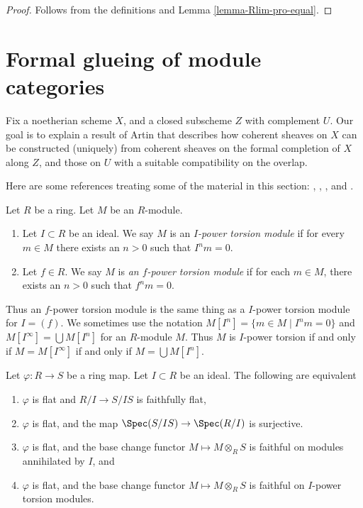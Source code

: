 \begin{proof}
Follows from the definitions and Lemma \ref{lemma-Rlim-pro-equal}.
\end{proof}










\section{Formal glueing of module categories}
\label{section-formal-glueing}

\noindent
Fix a noetherian scheme $X$, and a closed subscheme $Z$ with complement $U$.
Our goal is to explain a result of Artin that describes how coherent sheaves on
$X$ can be constructed (uniquely) from coherent sheaves on the formal
completion of $X$ along $Z$, and those on $U$ with a suitable compatibility on
the overlap.

\medskip\noindent
Here are some references treating some of the material in this section:
\cite[Section 2]{ArtinII},
\cite[Appendix]{Ferrand-Raynaud},
\cite{MB}, and
\cite[Section 4.6]{dJ-crystalline}.

\begin{definition}
\label{definition-f-power-torsion}
Let $R$ be a ring. Let $M$ be an $R$-module.
\begin{enumerate}
\item Let $I \subset R$ be an ideal. We say $M$ is an
{\it $I$-power torsion module} if for every $m \in M$ there exists an $n > 0$
such that $I^n m = 0$.
\item Let $f \in R$. We say $M$ is
{\it an $f$-power torsion module} if for each
$m \in M$, there exists an $n > 0$ such that $f^n m = 0$.
\end{enumerate}
\end{definition}

\noindent
Thus an $f$-power torsion module is the same thing as a $I$-power torsion
module for $I = (f)$. We sometimes use the notation
$M[I^n] = \{m \in M \mid I^nm = 0\}$ and $M[I^\infty] = \bigcup M[I^n]$
for an $R$-module $M$. Thus $M$ is $I$-power torsion if and only if
$M = M[I^\infty]$ if and only if $M = \bigcup M[I^n]$.

\begin{lemma}
\label{lemma-characterize-flatness-on-torsion}
Let $\varphi : R \to S$ be a ring map. Let $I \subset R$ be an ideal.
The following are equivalent
\begin{enumerate}
\item $\varphi$ is flat and $R/I \to S/IS$ is faithfully flat,
\item $\varphi$ is flat, and the map
$\Spec(S/IS) \to \Spec(R/I)$ is surjective.
\item $\varphi$ is flat, and the base change functor
$M \mapsto M \otimes_R S$ is faithful on modules annihilated by $I$, and
\item $\varphi$ is flat, and the base change functor
$M \mapsto M \otimes_R S$ is faithful on $I$-power torsion modules.
\end{enumerate}
\end{lemma}

